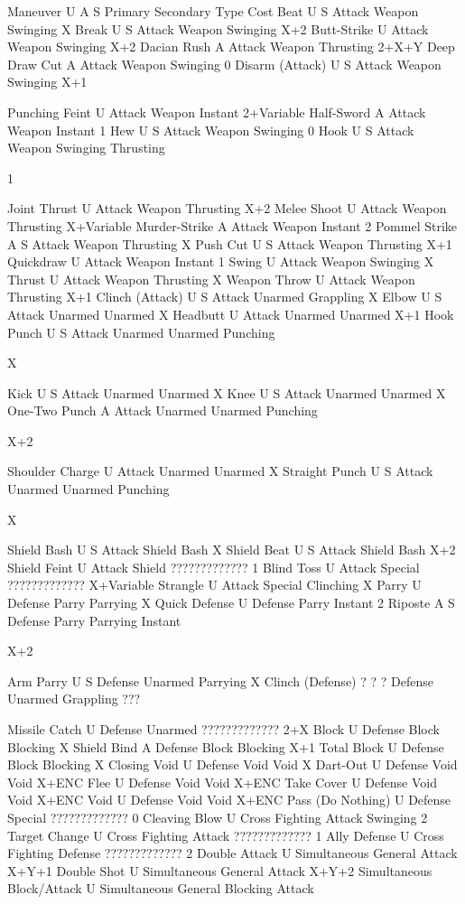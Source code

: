 \documentclass[oneside,11pt,english]{book}
\begin{document}
 

Maneuver U A S Primary Secondary Type Cost 
Beat U S Attack Weapon Swinging X 
Break U S Attack Weapon Swinging X+2 
Butt-Strike U Attack Weapon Swinging X+2 
Dacian Rush A Attack Weapon Thrusting 2+X+Y 
Deep Draw Cut A Attack Weapon Swinging 0 
Disarm (Attack) U S Attack Weapon Swinging X+1 


Punching 
Feint U Attack Weapon Instant 2+Variable 
Half-Sword A Attack Weapon Instant 1 
Hew U S Attack Weapon Swinging 0 
Hook U S Attack Weapon Swinging 
Thrusting 

1 

Joint Thrust U Attack Weapon Thrusting X+2 
Melee Shoot U Attack Weapon Thrusting X+Variable 
Murder-Strike A Attack Weapon Instant 2 
Pommel Strike A S Attack Weapon Thrusting X 
Push Cut U S Attack Weapon Thrusting X+1 
Quickdraw U Attack Weapon Instant 1 
Swing U Attack Weapon Swinging X 
Thrust U Attack Weapon Thrusting X 
Weapon Throw U Attack Weapon Thrusting X+1 
Clinch (Attack) U S Attack Unarmed Grappling X 
Elbow U S Attack Unarmed Unarmed X 
Headbutt U Attack Unarmed Unarmed X+1 
Hook Punch U S Attack Unarmed Unarmed 
Punching 

X 

Kick U S Attack Unarmed Unarmed X 
Knee U S Attack Unarmed Unarmed X 
One-Two Punch A Attack Unarmed Unarmed 
Punching 

X+2 

Shoulder Charge U Attack Unarmed Unarmed X 
Straight Punch U S Attack Unarmed Unarmed 
Punching 

X 

Shield Bash U S Attack Shield Bash X 
Shield Beat U S Attack Shield Bash X+2 
Shield Feint U Attack Shield ????????????? 1 
Blind Toss U Attack Special ????????????? X+Variable 
Strangle U Attack Special Clinching X 
Parry U Defense Parry Parrying X 
Quick Defense U Defense Parry Instant 2 
Riposte A S Defense Parry Parrying 
Instant 

X+2 

Arm Parry U S Defense Unarmed Parrying X 
Clinch (Defense) ? ? ? Defense Unarmed Grappling ??? 


Missile Catch U Defense Unarmed ????????????? 2+X 
Block U Defense Block Blocking X 
Shield Bind A Defense Block Blocking X+1 
Total Block U Defense Block Blocking X 
Closing Void U Defense Void Void X 
Dart-Out U Defense Void Void X+ENC 
Flee U Defense Void Void X+ENC 
Take Cover U Defense Void Void X+ENC 
Void U Defense Void Void X+ENC 
Pass (Do Nothing) U Defense Special ????????????? 0 
Cleaving Blow U Cross Fighting Attack Swinging 2 
Target Change U Cross Fighting Attack ????????????? 1 
Ally Defense U Cross Fighting Defense ????????????? 2 
Double Attack U Simultaneous General Attack X+Y+1 
Double Shot U Simultaneous General Attack X+Y+2 
Simultaneous Block/Attack U Simultaneous General Blocking 
Attack 
\end{document}
